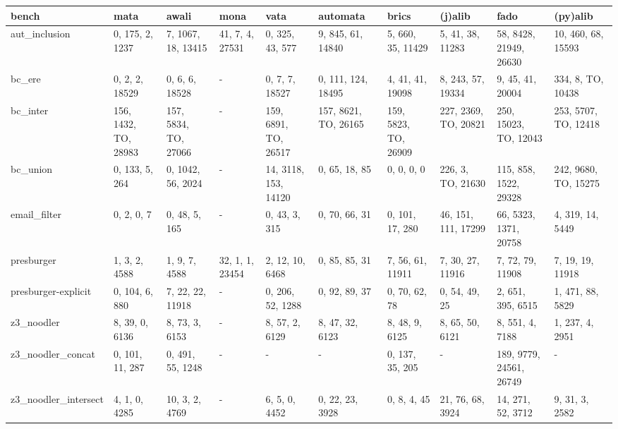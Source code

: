 \begin{tabular}{llllllllll}
\hline
 bench                & mata                 & awali                & mona            & vata                 & automata             & brics                & (j)alib              & fado                    & (py)alib             \\
\hline
 aut\_inclusion        & 0, 175, 2, 1237      & 7, 1067, 18, 13415   & 41, 7, 4, 27531 & 0, 325, 43, 577      & 9, 845, 61, 14840    & 5, 660, 35, 11429    & 5, 41, 38, 11283     & 58, 8428, 21949, 26630  & 10, 460, 68, 15593   \\
 bc\_ere               & 0, 2, 2, 18529       & 0, 6, 6, 18528       & -               & 0, 7, 7, 18527       & 0, 111, 124, 18495   & 4, 41, 41, 19098     & 8, 243, 57, 19334    & 9, 45, 41, 20004        & 334, 8, TO, 10438    \\
 bc\_inter             & 156, 1432, TO, 28983 & 157, 5834, TO, 27066 & -               & 159, 6891, TO, 26517 & 157, 8621, TO, 26165 & 159, 5823, TO, 26909 & 227, 2369, TO, 20821 & 250, 15023, TO, 12043   & 253, 5707, TO, 12418 \\
 bc\_union             & 0, 133, 5, 264       & 0, 1042, 56, 2024    & -               & 14, 3118, 153, 14120 & 0, 65, 18, 85        & 0, 0, 0, 0           & 226, 3, TO, 21630    & 115, 858, 1522, 29328   & 242, 9680, TO, 15275 \\
 email\_filter         & 0, 2, 0, 7           & 0, 48, 5, 165        & -               & 0, 43, 3, 315        & 0, 70, 66, 31        & 0, 101, 17, 280      & 46, 151, 111, 17299  & 66, 5323, 1371, 20758   & 4, 319, 14, 5449     \\
 presburger           & 1, 3, 2, 4588        & 1, 9, 7, 4588        & 32, 1, 1, 23454 & 2, 12, 10, 6468      & 0, 85, 85, 31        & 7, 56, 61, 11911     & 7, 30, 27, 11916     & 7, 72, 79, 11908        & 7, 19, 19, 11918     \\
 presburger-explicit  & 0, 104, 6, 880       & 7, 22, 22, 11918     & -               & 0, 206, 52, 1288     & 0, 92, 89, 37        & 0, 70, 62, 78        & 0, 54, 49, 25        & 2, 651, 395, 6515       & 1, 471, 88, 5829     \\
 z3\_noodler           & 8, 39, 0, 6136       & 8, 73, 3, 6153       & -               & 8, 57, 2, 6129       & 8, 47, 32, 6123      & 8, 48, 9, 6125       & 8, 65, 50, 6121      & 8, 551, 4, 7188         & 1, 237, 4, 2951      \\
 z3\_noodler\_concat    & 0, 101, 11, 287      & 0, 491, 55, 1248     & -               & -                    & -                    & 0, 137, 35, 205      & -                    & 189, 9779, 24561, 26749 & -                    \\
 z3\_noodler\_intersect & 4, 1, 0, 4285        & 10, 3, 2, 4769       & -               & 6, 5, 0, 4452        & 0, 22, 23, 3928      & 0, 8, 4, 45          & 21, 76, 68, 3924     & 14, 271, 52, 3712       & 9, 31, 3, 2582       \\
\hline
\end{tabular}